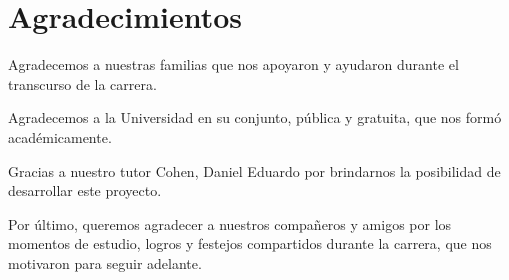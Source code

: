 
\chapter*{Agradecimientos}


Agradecemos a nuestras familias que nos apoyaron y ayudaron durante el transcurso de la carrera.

Agradecemos a la Universidad en su conjunto, pública y gratuita, que nos formó académicamente.

Gracias a nuestro tutor Cohen, Daniel Eduardo por brindarnos la posibilidad de desarrollar este proyecto. 

Por último, queremos agradecer a nuestros compañeros y amigos por los momentos de estudio, logros y festejos compartidos durante la carrera, que nos motivaron para seguir adelante.

\label{chap:agradecimientos}




